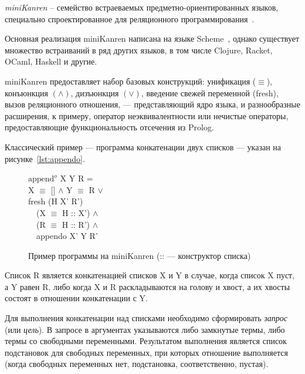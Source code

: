 {\it miniKanren} -- семейство встраеваемых предметно-ориентированных языков, специально спроектированное для
реляционного программирования~\cite{byrdMK}.

Основная реализация miniKanren написана на языке Scheme~\cite{reasonedSchemer}, однако существует множество встраиваний
в ряд других языков, в том числе Clojure, Racket, OCaml, Haskell и другие.

miniKanren предоставляет набор базовых конструкций: унификация ($\equiv$),
конъюнкция $(\land)$, дизъюнкция $(\lor)$, введение свежей переменной (fresh), вызов реляционного отношения,
--- представляющий ядро языка, и разнообразные расширения, к примеру, оператор неэквивалентности
 или нечистые операторы, предоставляющие функциональность
отсечения  из Prolog.

Классический пример --- программа конкатенации двух списков --- указан на рисунке~\ref{lst:appendo}.

\begin{figure}[h!]
$\text{append}^o$ X Y R = \\
X $\equiv$ [] $\land$ Y $\equiv$ R $\lor$ \\
fresh (H X' R') \\
\ \ (X $\equiv$ H :: X') $\land$ \\
\ \ (R $\equiv$ H :: R') $\land$ \\
\ \ appendo X' Y R'
\label{list:appendo}
\caption{Пример программы на miniKanren (:: --- конструктор списка)}
\end{figure}

Список R является конкатенацией списков X и Y в случае, когда список X пуст, а Y равен R, либо
когда X и R раскладываются на голову и хвост, а их хвосты состоят в отношении конкатенации с Y.

Для выполнения конкатенации над списками необходимо сформировать \emph{запрос} (или \emph{цель}).
В запросе в аргументах указываются либо замкнутые термы, либо термы со свободными переменными. Результатом
выполнения является список подстановок для свободных переменных, при которых отношение выполняется
(когда свободных переменных нет, подстановка, соответственно, пустая).



